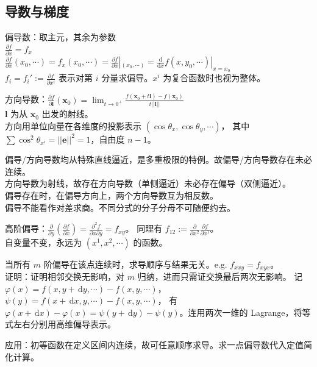 \documentclass[12pt, a4paper, UTF8, openany]{ctexbook}
\newcommand{\dif}{\mathrm{d}}
\newcommand{\difx}{\,\mathrm{d}x}
\newcommand{\dify}{\,\mathrm{d}y}
\newcommand{\mat}[1]{\mathbf{#1}}
\begin{document}
        \subsection{导数与梯度}
        偏导数：取主元，其余为参数 \\
        $\frac{\partial f}{\partial x} = f_x$ \\
        $\frac{\partial f}{\partial x}(x_0, \cdots) = f_x (x_0, \cdots) 
        = \frac{\partial f}{\partial x}|_{(x_0, \cdots)} = \frac{\dif}{\dif x} f(x, y_0, \cdots)|_{x = x_0}$ \\
        $f_i = f_i' := \frac{\partial f}{\partial x^i}$ 表示对第 $i$ 分量求偏导。$x^i$ 为复合函数时也视为整体。

        方向导数：$\frac{\partial f}{\partial \mat{l}}(\mat{x}_0) 
        = \lim_{t \to 0^{+}} \frac{f(\mat{x}_0 + t\mat{l}) - f(\mat{x}_0)}{t || \mat{l} ||}$ \\
        $\mat{l}$ 为从 $\mat{x}_0$ 出发的射线。\\
        方向用单位向量在各维度的投影表示 $(\cos\theta_x, \cos\theta_y, \cdots)$，
        其中 $\sum \cos^2 \theta_{x^i} = ||\mat{e}||^2 = 1$，自由度 $n - 1$。

        偏导/方向导数均从特殊直线逼近，是多重极限的特例。故{\heiti 偏导/方向导数存在未必连续}。\\
        方向导数为射线，故存在方向导数（单侧逼近）未必存在偏导（双侧逼近）。\\
        偏导存在时，在偏导方向上，两个方向导数互为相反数。\\
        {\heiti 偏导不能看作对差求商}。不同分式的分子分母不可随便约去。

        高阶偏导：$\frac{\partial}{\partial y}(\frac{\partial f}{\partial x}) 
        = \frac{\partial^2 f}{\partial x \partial y} = f_{xy}$。
        同理有 $f_{12} := \frac{\partial}{\partial x^2} \frac{\partial f}{\partial x^1}$。\\
        {\heiti 自变量不变}，永远为 $(x^1, x^2, \cdots)$ 的函数。

        当所有 $m$ 阶偏导在该点连续时，{\heiti 求导顺序与结果无关}。e.g. $f_{xxy} = f_{xyx}$。\\
        证明：证明相邻交换无影响，对 $m$ 归纳，进而只需证交换最后两次无影响。
        记 $\varphi(x) = f(x, y + \dify, \cdots) - f(x, y, \cdots)$，$\psi(y) = f(x + \difx, y, \cdots) - f(x, y, \cdots)$，
        有 $\varphi(x + \difx) - \varphi(x) = \psi(y + \dify) - \psi(y)$。连用两次一维的 Lagrange，将等式左右分别用高维偏导表示。

        {\heiti 应用}：初等函数在定义区间内连续，故可{\heiti 任意顺序}求导。求一点偏导数代入定值简化计算。
\end{document}
